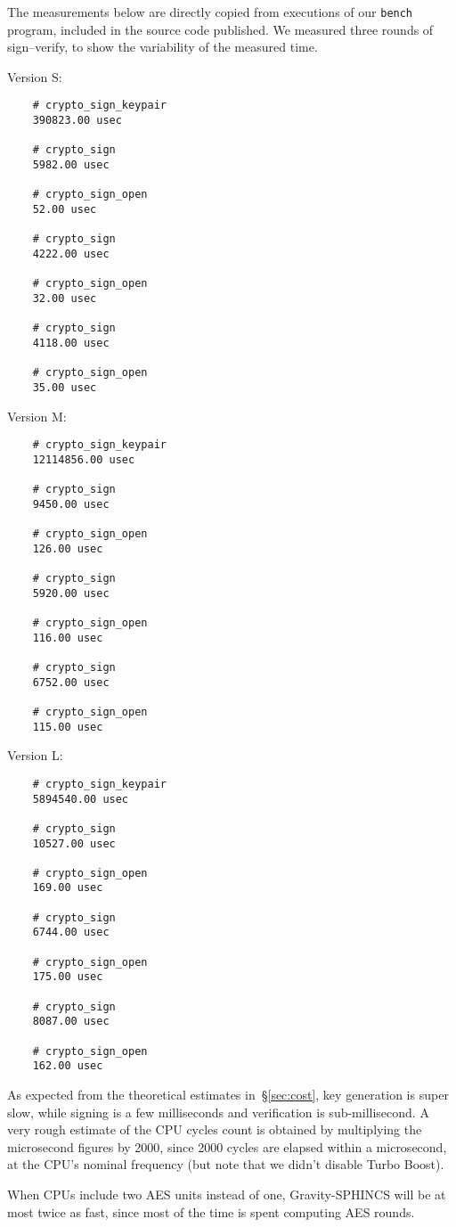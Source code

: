 The measurements below are directly copied from executions of our \texttt{bench} program, included in the source code published.
We measured three rounds of sign--verify, to show the variability of the measured time.

Version S:
{
\footnotesize
\begin{verbatim}
    # crypto_sign_keypair
    390823.00 usec
    
    # crypto_sign
    5982.00 usec
    
    # crypto_sign_open
    52.00 usec
    
    # crypto_sign
    4222.00 usec
    
    # crypto_sign_open
    32.00 usec
    
    # crypto_sign
    4118.00 usec
    
    # crypto_sign_open
    35.00 usec
\end{verbatim}
}

Version M:
{
\footnotesize
\begin{verbatim}
    # crypto_sign_keypair
    12114856.00 usec
    
    # crypto_sign
    9450.00 usec
    
    # crypto_sign_open
    126.00 usec
    
    # crypto_sign
    5920.00 usec
    
    # crypto_sign_open
    116.00 usec
    
    # crypto_sign
    6752.00 usec
    
    # crypto_sign_open
    115.00 usec
\end{verbatim}
}

Version L:
{
\footnotesize
\begin{verbatim}
    # crypto_sign_keypair
    5894540.00 usec
    
    # crypto_sign
    10527.00 usec
    
    # crypto_sign_open
    169.00 usec
    
    # crypto_sign
    6744.00 usec
    
    # crypto_sign_open
    175.00 usec
    
    # crypto_sign
    8087.00 usec
    
    # crypto_sign_open
    162.00 usec
\end{verbatim}
}

As expected from the theoretical estimates in~\S\ref{sec:cost}, key generation is super slow, while signing is a few milliseconds and verification is sub-millisecond.
A very rough estimate of the CPU cycles count is obtained by multiplying the microsecond figures by 2000, since 2000 cycles are elapsed within a microsecond, at the CPU's nominal frequency (but note that we didn't disable Turbo Boost).

When CPUs include two AES units instead of one, Gravity-SPHINCS will be at most twice as fast, since most of the time is spent computing AES rounds.

